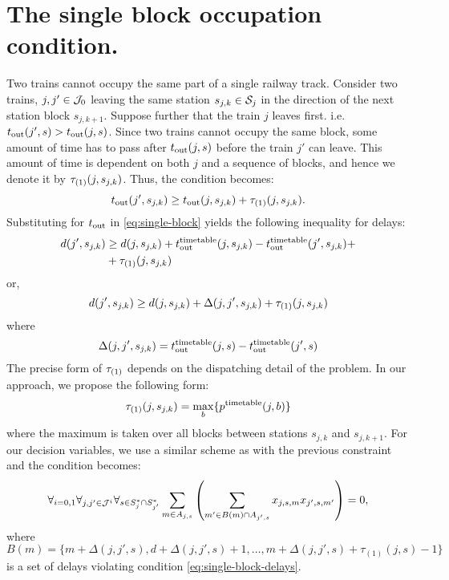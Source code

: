 \section{The single block occupation condition.}
Two trains cannot occupy the same part of a single railway track. Consider two
trains, $j, j' \in \mathcal{J}_0$ leaving the same station $s_{j,k} \in \mathcal{S}_j$ in the direction of the
next station block $s_{j,k+1}$. Suppose further that the train $j$ leaves
first. i.e. $t_\text{out}(j', s) > t_\text{out}(j, s)$. Since two trains cannot occupy the
same block, some amount of time has to pass after $t_\text{out}(j, s)$ before the
train $j'$ can leave. This amount of time is dependent on both $j$ and a
sequence of blocks, and hence we denote it by $\tau_{(1)}(j, s_{j,k})$. Thus,
the condition becomes:
\begin{equation}
  \label{eq:single-block}
  t_\text{out}(j', s_{j,k}) \ge t_\text{out}(j, s_{j,k}) + \tau_{(1)}(j, s_{j,k}).
\end{equation}
Substituting for $t_\text{out}$ in \eqref{eq:single-block} yields the following
inequality for delays:
\begin{equation}
\begin{split}
  \label{eq:single-block-delays}
  d(j', s_{j,k}) &\ge d(j, s_{j,k}) + t_\text{out}^\text{timetable}(j, s_{j,k}) - t_\text{out}^\text{timetable}(j', s_{j,k}) + \\
  &+\tau_{(1)}(j, s_{j,k})
\end{split}
\end{equation}
or,
\begin{equation}
  d(j', s_{j,k}) \ge d(j, s_{j,k}) + \Delta(j, j',s_{j,k}) + \tau_{(1)}(j, s_{j,k})
\end{equation}
where
\begin{equation}
  \label{eq:delta}
  \Delta(j, j', s_{j,k}) = t_\text{out}^\text{timetable}(j, s) - t_\text{out}^\text{timetable}(j', s)
\end{equation}
The precise form of $\tau_{(1)}$ depends on the dispatching detail of the problem.
In our approach, we propose the following form:
\begin{equation}
  \tau_{(1)}(j, s_{j,k}) = \max_{b}\{p^\text{timetable}(j,b)\}
\end{equation}
where the maximum is taken over all blocks between stations $s_{j,k}$ and $s_{j,k+1}$.
For our decision variables, we use a similar scheme as with the previous
constraint and the condition becomes:
\begin{equation}
  \label{eq:qubo:singleblock}
  \forall_{i=0,1} \forall_{j, j' \in \mathcal{J}^{i}} \forall_{s \in S^{*}_{j} \cap S^{*}_{j'}} \sum_{m \in A_{j, s}} \left(
  \sum_{m' \in B(m) \cap A_{j', s}} x_{j,s,m}x_{j',s,m'}
  \right) = 0,
\end{equation}
where $B(m) = \{m + \Delta(j, j', s), d + \Delta(j, j', s)+ 1,\ldots, m +
    \Delta(j, j', s) + \tau_{(1)}(j,s)-1 \}$ is a set of delays
violating condition \eqref{eq:single-block-delays}.

